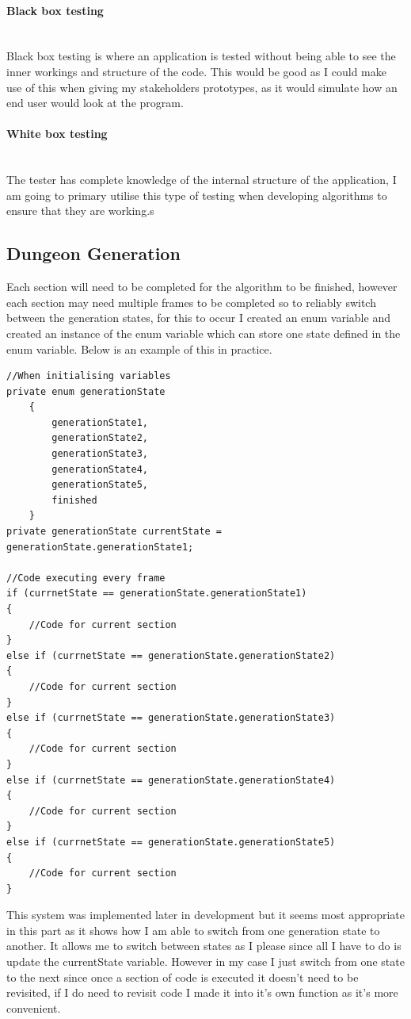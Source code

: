 \documentclass{article}
\newcommand{\myparagraph}[1]{\paragraph{#1}\mbox{}\\} %
\begin{document}
\myparagraph{Black box testing}
Black box testing is where an application is tested without being able to see the inner workings and structure of the code. This would be good as I could make use of this when giving my stakeholders prototypes, as it would simulate how an end user would look at the program.

\myparagraph{White box testing} 
The tester has complete knowledge of the internal structure of the application, I am going to primary utilise this type of testing when developing algorithms to ensure that they are working.s

\subsection{Dungeon Generation}
Each section will need to be completed for the algorithm to be finished, however each section may need multiple frames to be completed so to reliably switch between the generation states, for this to occur I created an enum variable and created an instance of the enum variable which can store one state defined in the enum variable. Below is an example of this in practice.
\begin{lstlisting}
//When initialising variables
private enum generationState
    {
        generationState1,
        generationState2,
        generationState3,
        generationState4,
        generationState5,
        finished
    }
private generationState currentState = generationState.generationState1;

//Code executing every frame
if (currnetState == generationState.generationState1)
{
	//Code for current section
}
else if (currnetState == generationState.generationState2)
{
	//Code for current section
}
else if (currnetState == generationState.generationState3)
{
	//Code for current section
}
else if (currnetState == generationState.generationState4)
{
	//Code for current section
}
else if (currnetState == generationState.generationState5)
{
	//Code for current section
}
\end{lstlisting}
This system was implemented later in development but it seems most appropriate in this part as it shows how I am able to switch from one generation state to another. It allows me to switch between states as I please since all I have to do is update the currentState variable. However in my case I just switch from one state to the next since once a section of code is executed it doesn't need to be revisited, if I do need to revisit code I made it into it's own function as it's more convenient.
\end{document}
